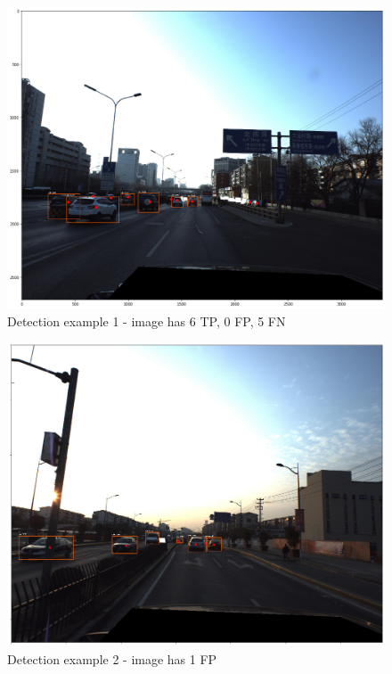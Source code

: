 \begin{figure}
\centering
\includegraphics[width=0.8\linewidth]{images/TP-6-FP-0-FN-5.png}
\caption{Detection example 1 - image has 6 TP, 0 FP, 5 FN }
\label{fig:example6TP5FN}
\end{figure} 



\begin{figure}
\centering
\includegraphics[width=0.8\linewidth]{images/FP-1.png}
\caption{Detection example 2 - image has 1 FP }
\label{fig:example1FP}
\end{figure} 
